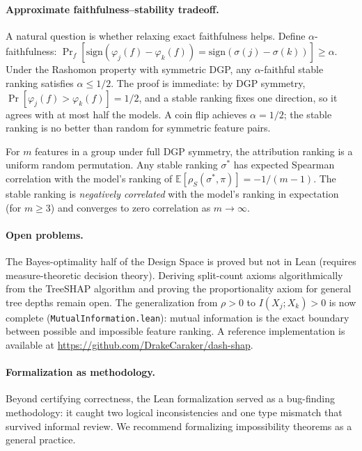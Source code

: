 \documentclass{article}
\newcommand{\E}{\mathbb{E}}
\begin{document}
\paragraph{Approximate faithfulness--stability tradeoff.}
A natural question is whether relaxing exact faithfulness helps. Define $\alpha$-faithfulness: $\Pr_f[\text{sign}(\varphi_j(f) - \varphi_k(f)) = \text{sign}(\sigma(j) - \sigma(k))] \geq \alpha$. Under the Rashomon property with symmetric DGP, any $\alpha$-faithful stable ranking satisfies $\alpha \leq 1/2$. The proof is immediate: by DGP symmetry, $\Pr[\varphi_j(f) > \varphi_k(f)] = 1/2$, and a stable ranking fixes one direction, so it agrees with at most half the models. A coin flip achieves $\alpha = 1/2$; the stable ranking is no better than random for symmetric feature pairs.

For $m$ features in a group under full DGP symmetry, the attribution ranking is a uniform random permutation. Any stable ranking $\sigma^*$ has expected Spearman correlation with the model's ranking of $\E[\rho_S(\sigma^*, \pi)] = -1/(m-1)$. The stable ranking is \emph{negatively correlated} with the model's ranking in expectation (for $m \geq 3$) and converges to zero correlation as $m \to \infty$.

\paragraph{Open problems.}
The Bayes-optimality half of the Design Space is proved but not in Lean (requires measure-theoretic decision theory). Deriving split-count axioms algorithmically from the TreeSHAP algorithm and proving the proportionality axiom for general tree depths remain open. The generalization from $\rho > 0$ to $I(X_j; X_k) > 0$ is now complete (\texttt{MutualInformation.lean}): mutual information is the exact boundary between possible and impossible feature ranking. A reference implementation is available at \url{https://github.com/DrakeCaraker/dash-shap}.

\paragraph{Formalization as methodology.}
Beyond certifying correctness, the Lean formalization served as a bug-finding methodology: it caught two logical inconsistencies and one type mismatch that survived informal review. We recommend formalizing impossibility theorems as a general practice.

\end{document}

